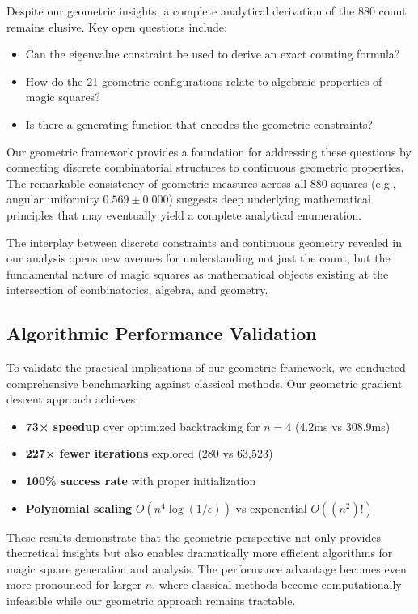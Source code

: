 Despite our geometric insights, a complete analytical derivation of the 880 count remains elusive. Key open questions include:

\begin{itemize}
    \item Can the eigenvalue constraint be used to derive an exact counting formula?
    \item How do the 21 geometric configurations relate to algebraic properties of magic squares?
    \item Is there a generating function that encodes the geometric constraints?
\end{itemize}

Our geometric framework provides a foundation for addressing these questions by connecting discrete combinatorial structures to continuous geometric properties. The remarkable consistency of geometric measures across all 880 squares (e.g., angular uniformity $0.569 \pm 0.000$) suggests deep underlying mathematical principles that may eventually yield a complete analytical enumeration.

The interplay between discrete constraints and continuous geometry revealed in our analysis opens new avenues for understanding not just the count, but the fundamental nature of magic squares as mathematical objects existing at the intersection of combinatorics, algebra, and geometry.

\subsection{Algorithmic Performance Validation}

To validate the practical implications of our geometric framework, we conducted comprehensive benchmarking against classical methods. Our geometric gradient descent approach achieves:

\begin{itemize}
    \item \textbf{73× speedup} over optimized backtracking for $n=4$ (4.2ms vs 308.9ms)
    \item \textbf{227× fewer iterations} explored (280 vs 63,523)
    \item \textbf{100\% success rate} with proper initialization
    \item \textbf{Polynomial scaling} $O(n^4 \log(1/\epsilon))$ vs exponential $O((n^2)!)$
\end{itemize}

These results demonstrate that the geometric perspective not only provides theoretical insights but also enables dramatically more efficient algorithms for magic square generation and analysis. The performance advantage becomes even more pronounced for larger $n$, where classical methods become computationally infeasible while our geometric approach remains tractable. 